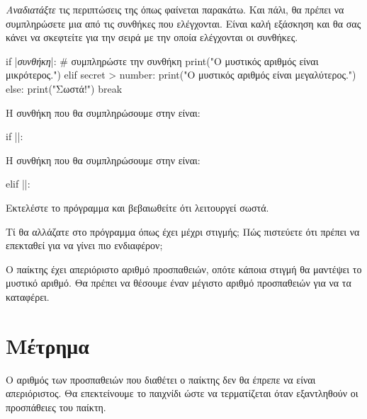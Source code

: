 \documentclass[a4paper,11pt,oneside]{book}
\begin{document}
\begin{step}
\emph{Αναδιατάξτε} τις περιπτώσεις της  όπως φαίνεται παρακάτω. Και πάλι, θα πρέπει να συμπληρώσετε μια από τις συνθήκες που ελέγχονται. Είναι καλή εξάσκηση και θα σας κάνει να σκεφτείτε για την σειρά με την οποία ελέγχονται οι συνθήκες.

\begin{pynew}
    if |\textrm{\textit{συνθήκη}}|: # συμπληρώστε την συνθήκη
        print("Ο μυστικός αριθμός είναι μικρότερος.")
    elif secret > number:
        print("Ο μυστικός αριθμός είναι μεγαλύτερος.")
    else:
        print("Σωστά!")
        break
\end{pynew}

\begin{answer}
Η συνθήκη που θα συμπληρώσουμε στην  είναι:

\begin{pyplain}
if ||:
\end{pyplain}
		
Η συνθήκη που θα συμπληρώσουμε στην  είναι:	

\begin{pyplain}
elif ||:
\end{pyplain}
\end{answer}

Εκτελέστε το πρόγραμμα και βεβαιωθείτε ότι λειτουργεί σωστά. 

Τί θα αλλάζατε στο πρόγραμμα όπως έχει μέχρι στιγμής; Πώς πιστεύετε ότι πρέπει να επεκταθεί για να γίνει πιο ενδιαφέρον;

\begin{answer}
Ο παίκτης έχει απεριόριστο αριθμό προσπαθειών, οπότε κάποια στιγμή θα μαντέψει το μυστικό αριθμό. Θα πρέπει να θέσουμε έναν  μέγιστο αριθμό προσπαθειών για να τα καταφέρει.
\end{answer}
\end{step}

\section{Μέτρημα}

Ο αριθμός των προσπαθειών που διαθέτει ο παίκτης δεν θα έπρεπε να είναι απεριόριστος. Θα επεκτείνουμε το παιχνίδι ώστε να τερματίζεται όταν εξαντληθούν οι προσπάθειες του παίκτη.
\end{document}
